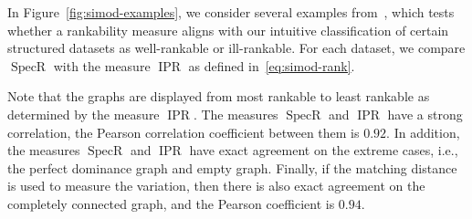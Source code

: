 \documentclass{article}
\DeclareMathOperator{\specr}{SpecR}
\DeclareMathOperator{\ipr}{IPR}
\begin{document}
In Figure~\ref{fig:simod-examples}, we consider several examples from~\cite{Anderson2018}, which tests whether a rankability measure aligns with our intuitive classification of certain structured datasets as well-rankable or ill-rankable.
For each dataset, we compare $\specr$ with the measure $\ipr$ as defined in~\eqref{eq:simod-rank}.

Note that the graphs are displayed from most rankable to least rankable as determined by the measure $\ipr$.
The measures $\specr$ and $\ipr$ have a strong correlation, the Pearson correlation coefficient between them is $0.92$. 
In addition, the measures $\specr$ and $\ipr$ have exact agreement on the extreme cases, i.e., the perfect dominance graph and empty graph.
Finally, if the matching distance is used to measure the variation, then there is also exact agreement on the completely connected graph, and the Pearson coefficient is $0.94$.
\end{document}
